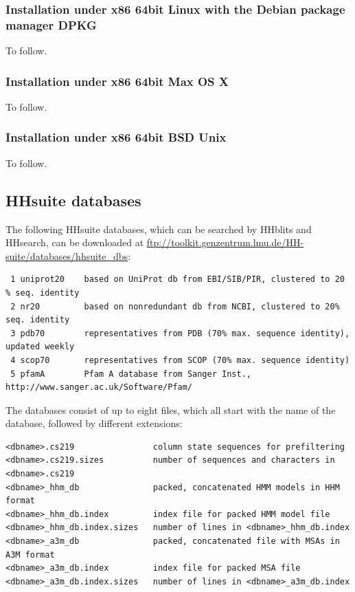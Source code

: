 \documentclass[11pt,a4paper]{article}
\begin{document}
\subsubsection*{Installation under x86 64bit Linux with the Debian package manager DPKG}

To follow.


\subsubsection*{Installation under x86 64bit Max OS X}

To follow.


\subsubsection*{Installation under x86 64bit BSD Unix}

To follow.


\subsection{HHsuite databases} \label{hhblits_dbs}
The following HHsuite databases, which can be searched by HHblits and HHsearch, 
can be downloaded at \url{ftp://toolkit.genzentrum.lmu.de/HH-suite/databases/hhsuite_dbs}: 
\small 
\begin{verbatim}
 1 uniprot20    based on UniProt db from EBI/SIB/PIR, clustered to 20 % seq. identity
 2 nr20         based on nonredundant db from NCBI, clustered to 20% seq. identity
 3 pdb70        representatives from PDB (70% max. sequence identity), updated weekly
 4 scop70       representatives from SCOP (70% max. sequence identity)
 5 pfamA        Pfam A database from Sanger Inst., http://www.sanger.ac.uk/Software/Pfam/
\end{verbatim} 
\normalsize

The databases consist of up to eight files, which all start with the name of the database, followed by different extensions:
\begin{verbatim}
<dbname>.cs219                column state sequences for prefiltering
<dbname>.cs219.sizes          number of sequences and characters in <dbname>.cs219  
<dbname>_hhm_db               packed, concatenated HMM models in HHM format
<dbname>_hhm_db.index         index file for packed HMM model file
<dbname>_hhm_db.index.sizes   number of lines in <dbname>_hhm_db.index
<dbname>_a3m_db               packed, concatenated file with MSAs in A3M format
<dbname>_a3m_db.index         index file for packed MSA file
<dbname>_a3m_db.index.sizes   number of lines in <dbname>_a3m_db.index
\end{verbatim}
\end{document}
